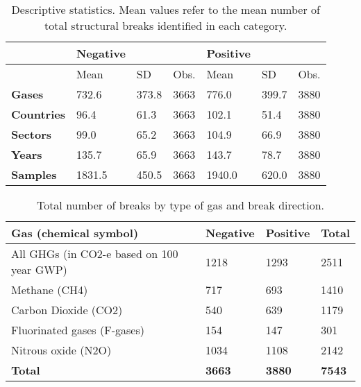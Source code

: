 \documentclass[a4paper]{article}
\begin{document}
\begin{table}[!ht]
    \centering
    \caption{Descriptive statistics. Mean values refer to the mean number of total structural breaks identified in each category.}
    \renewcommand{\arraystretch}{1.3}
    \begin{tabular}{ p{2cm} l l p{2cm} l l l }
    \hline
        & \textbf{Negative} & \textbf{} & \textbf{} & \textbf{Positive} & \textbf{} & \textbf{} \\ \hline
        \textbf{} & Mean & SD & Obs. & Mean & SD & Obs. \\ 
        \textbf{Gases} & 732.6 & 373.8 & 3663 & 776.0 & 399.7 & 3880 \\ 
        \textbf{Countries} & 96.4 & 61.3 & 3663 & 102.1 & 51.4 & 3880 \\ 
        \textbf{Sectors} & 99.0 & 65.2 & 3663 & 104.9 & 66.9 & 3880 \\ 
        \textbf{Years} & 135.7 & 65.9 & 3663 & 143.7 & 78.7 & 3880 \\ 
        \textbf{Samples} & 1831.5 & 450.5 & 3663 & 1940.0 & 620.0 & 3880 \\ \hline
    \end{tabular}
    \label{tab:descriptives_summary}
\end{table}

\begin{table}[!ht]
    \centering
    \caption{Total number of breaks by type of gas and break direction.}
    \renewcommand{\arraystretch}{1.2}
    \begin{tabular}{llll}
    \hline
        \textbf{Gas (chemical symbol)}& \textbf{Negative} & \textbf{Positive} & \textbf{Total} \\ \hline
        All GHGs (in CO2-e based on 100 year GWP)& 1218 & 1293 & 2511 \\ 
        Methane (CH4) & 717 & 693 & 1410 \\ 
        Carbon Dioxide (CO2) & 540 & 639 & 1179 \\ 
        Fluorinated gases (F-gases)& 154 & 147 & 301 \\ 
        Nitrous oxide (N2O) & 1034 & 1108 & 2142 \\ \hline
        \textbf{Total} & \textbf{3663} & \textbf{3880} & \textbf{7543} \\ \hline
    \end{tabular}
    \label{tab:breaks_by_gas}
\end{table}
\end{document}
